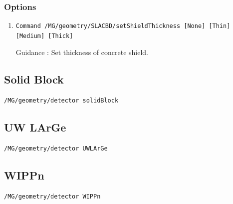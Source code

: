 \subsubsection{Options}
\begin{enumerate}
\item 
\begin{lstlisting}
Command /MG/geometry/SLACBD/setShieldThickness [None] [Thin] [Medium] [Thick]
\end{lstlisting}
Guidance : Set thickness of concrete shield.

\end{enumerate}

\subsection{Solid Block}
\begin{lstlisting}
/MG/geometry/detector solidBlock
\end{lstlisting}

\subsection{UW LArGe}
\begin{lstlisting}
/MG/geometry/detector UWLArGe
\end{lstlisting}

\subsection{WIPPn}
\begin{lstlisting}
/MG/geometry/detector WIPPn
\end{lstlisting}

